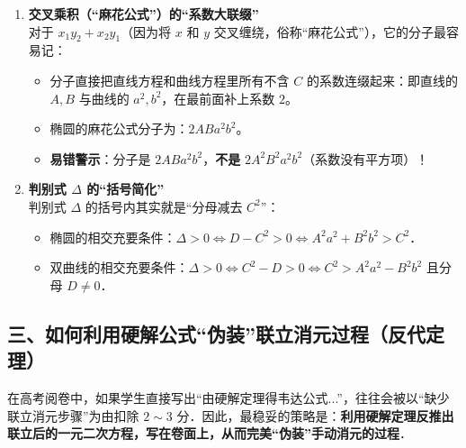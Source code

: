 \documentclass[11pt,a4paper]{ctexart}
\begin{document}
\begin{enumerate}[label=\arabic*.]
  \item \textbf{交叉乘积（“麻花公式”）的“系数大联缀”} \\
        对于 $x_1y_2 + x_2y_1$（因为将 $x$ 和 $y$ 交叉缠绕，俗称“麻花公式”），它的分子最容易记：
        \begin{itemize}
          \item 分子直接把直线方程和曲线方程里所有不含 $C$ 的系数连缀起来：即直线的 $A, B$ 与曲线的 $a^2, b^2$，在最前面补上系数 $2$。
          \item 椭圆的麻花公式分子为：$2ABa^2b^2$。
          \item \textbf{易错警示}：分子是 $2ABa^2b^2$，\textbf{不是} $2A^2B^2a^2b^2$（系数没有平方项）！
        \end{itemize}

  \item \textbf{判别式 $\Delta$ 的“括号简化”} \\
        判别式 $\Delta$ 的括号内其实就是“分母减去 $C^2$”：
        \begin{itemize}
          \item 椭圆的相交充要条件：$\Delta > 0 \iff D - C^2 > 0 \iff A^2a^2 + B^2b^2 > C^2$．
          \item 双曲线的相交充要条件：$\Delta > 0 \iff C^2 - D > 0 \iff C^2 > A^2a^2 - B^2b^2$ 且分母 $D \neq 0$．
        \end{itemize}
\end{enumerate}

\subsection*{三、如何利用硬解公式“伪装”联立消元过程（反代定理）}

在高考阅卷中，如果学生直接写出“由硬解定理得韦达公式...”，往往会被以“缺少联立消元步骤”为由扣除 $2 \sim 3$ 分．因此，最稳妥的策略是：\textbf{利用硬解定理反推出联立后的一元二次方程，写在卷面上，从而完美“伪装”手动消元的过程}．
\end{document}
